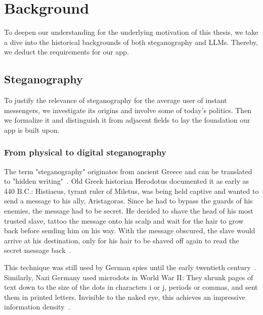 
\chapter{Background}\label{ch:background}
\glsresetall %

To deepen our understanding for the underlying motivation of this thesis, we take a dive into the historical backgrounds of both steganography and \glspl{LLM}. Thereby, we deduct the requirements for our app.

\section{Steganography}
\label{sec:steganography}
To justify the relevance of steganography for the average user of instant messengers, we investigate its origins and involve some of today's politics. Then we formalize it and distinguish it from adjacent fields to lay the foundation our app is built upon.

\subsection{From physical to digital steganography}
\label{sec:fromPhysicalToDigitalSteganography}
The term "steganography" originates from ancient Greece and can be translated to "hidden writing"~\cite{kolataVeiledMessagesTerror2001,dembartEndUserHide2001}. Old Greek historian Herodotus documented it as early as 440 B.C.: Histiaeus, tyrant ruler of Miletus, was being held captive and wanted to send a message to his ally, Aristagoras. Since he had to bypass the guards of his enemies, the message had to be secret. He decided to shave the head of his most trusted slave, tattoo the message onto his scalp and wait for the hair to grow back before sending him on his way. With the message obscured, the slave would arrive at his destination, only for his hair to be shaved off again to read the secret message back~\cite{bennettLinguisticSteganographySurvey2004,petitcolasInformationHidingSurvey1999,dembartEndUserHide2001}.

This technique was still used by German spies until the early twentieth century~\cite{petitcolasInformationHidingSurvey1999}. Similarly, Nazi Germany used microdots in World War II: They shrunk pages of text down to the size of the dots in characters i or j, periods or commas, and sent them in printed letters. Invisible to the naked eye, this achieves an impressive information density~\cite{dembartEndUserHide2001,petitcolasInformationHidingSurvey1999}.

